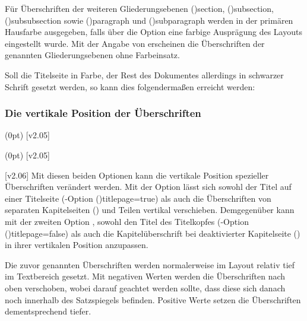 \begin{DeclareEntity*}{}
\begin{DeclareEntity*}{}
\begin{DeclareEntity*}{}
\begin{Declaration}
Für Überschriften der weiteren Gliederungsebenen
\Macro(){section}, 
\Macro(){subsection}, 
\Macro(){subsubsection} sowie 
\Macro(){paragraph} und 
\Macro(){subparagraph}
werden in der primären Hausfarbe  ausgegeben, falls über die 
Option  eine farbige Ausprägung des Layouts eingestellt wurde.
Mit der Angabe von  erscheinen die Überschriften der 
genannten Gliederungsebenen ohne Farbeinsatz.%
\end{Declaration}
%
\begin{Example}
Soll die Titelseite in Farbe, der Rest des Dokumentes allerdings in schwarzer 
Schrift gesetzt werden, so kann dies folgendermaßen erreicht werden:
\end{Example}
%



\subsubsection{Die vertikale Position der Überschriften}

\begin{Declaration}
  {}
  (0pt)
  [v2.05]
\begin{Declaration}
  {}
  (0pt)
  [v2.05]

[v2.06]%
Mit diesen beiden Optionen kann die vertikale Position spezieller Überschriften 
verändert werden. Mit der Option  lässt sich sowohl 
der Titel auf einer Titelseite 
(\KOMAScript-Option \Option(){titlepage=true}) als 
auch die Überschriften von separaten Kapitelseiten () 
und Teilen vertikal verschieben. Demgegenüber kann mit der zweiten Option 
, sowohl den Titel des Titelkopfes 
(\KOMAScript-Option \Option(){titlepage=false}) als 
auch die Kapitelüberschrift bei deaktivierter Kapitelseite 
() in ihrer vertikalen Position anzupassen.

Die zuvor genannten Überschriften werden normalerweise im Layout relativ tief 
im Textbereich gesetzt. Mit negativen Werten werden die Überschriften nach oben 
verschoben, wobei darauf geachtet werden sollte, dass diese sich danach noch 
innerhalb des Satzspiegels befinden. Positive Werte setzen die Überschriften 
dementsprechend tiefer.
\end{Declaration}
\end{Declaration}
%




\end{DeclareEntity*}
\end{DeclareEntity*}
\end{DeclareEntity*}
